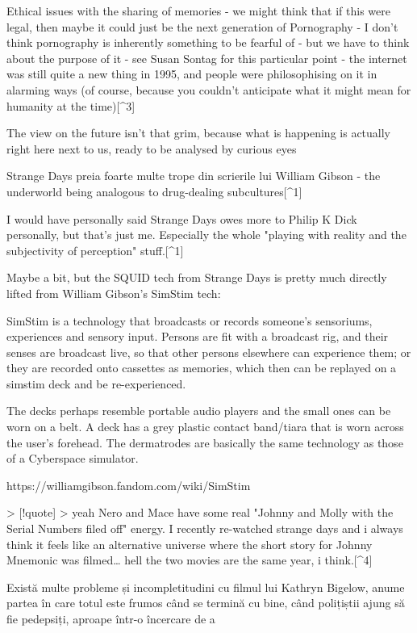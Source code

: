 \documentclass[12pt]{article}
\begin{document}
Ethical issues with the sharing of memories
- we might think that if this were legal, then maybe it could just be the next generation of Pornography
- I don't think pornography is inherently something to be fearful of
- but we have to think about the purpose of it
- see Susan Sontag for this particular point
- the internet was still quite a new thing in 1995, and people were philosophising on it in alarming ways (of course, because you couldn't anticipate what it might mean for humanity at the time)[^3]


The view on the future isn't that grim, because what is happening is actually right here next to us, ready to be analysed by curious eyes

Strange Days preia foarte multe trope din scrierile lui William Gibson
- the underworld being analogous to drug-dealing subcultures[^1]

I would have personally said Strange Days owes more to Philip K Dick personally, but that's just me. Especially the whole "playing with reality and the subjectivity of perception" stuff.[^1]

Maybe a bit, but the SQUID tech from Strange Days is pretty much directly lifted from William Gibson's SimStim tech:

SimStim is a technology that broadcasts or records someone's sensoriums, experiences and sensory input. Persons are fit with a broadcast rig, and their senses are broadcast live, so that other persons elsewhere can experience them; or they are recorded onto cassettes as memories, which then can be replayed on a simstim deck and be re-experienced.

The decks perhaps resemble portable audio players and the small ones can be worn on a belt. A deck has a grey plastic contact band/tiara that is worn across the user's forehead. The dermatrodes are basically the same technology as those of a Cyberspace simulator.

https://williamgibson.fandom.com/wiki/SimStim

> [!quote]
> yeah Nero and Mace have some real "Johnny and Molly with the Serial Numbers filed off" energy. I recently re-watched strange days and i always think it feels like an alternative universe where the short story for Johnny Mnemonic was filmed… hell the two movies are the same year, i think.[^4]

Există multe probleme și incompletitudini cu filmul lui Kathryn Bigelow, anume partea în care totul este frumos când se termină cu bine, când polițiștii ajung să fie pedepsiți, aproape într-o încercare de a
\end{document}
